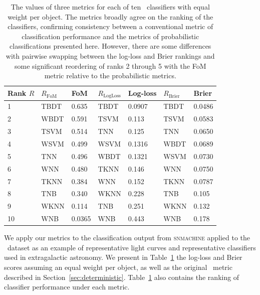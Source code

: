 \begin{table}[]
	\begin{centering}
\begin{tabular}{lllllll}%
Rank $R$ & $R_\mathrm{FoM}$ & FoM & %
$R_\mathrm{LogLoss}$ & Log-loss & $R_\mathrm{Brier}$ & Brier \\
\hline
1  & TBDT & 0.635  %
& TBDT & 0.0907 & TBDT & 0.0486 \\
2  & WBDT & 0.591  %
& TSVM & 0.113  & TSVM & 0.0583 \\
3  & TSVM & 0.514  %
& TNN  & 0.125  & TNN  & 0.0650 \\
4  & WSVM & 0.499  %
& WSVM & 0.1316 & WBDT & 0.0689 \\
5  & TNN  & 0.496  %
& WBDT & 0.1321 & WSVM & 0.0730 \\
6  & WNN  & 0.480  %
& TKNN & 0.146  & WNN  & 0.0750 \\
7  & TKNN & 0.384  %
& WNN  & 0.152  & TKNN & 0.0787 \\
8  & TNB  & 0.340  %
& WKNN & 0.228  & TNB  & 0.105  \\
9  & WKNN & 0.114  %
& TNB  & 0.251  & WKNN & 0.132  \\
10 & WNB  & 0.0365 %
& WNB  & 0.443  & WNB  & 0.178  \\
\end{tabular}
	\caption{
	The values of three metrics for each of ten \snmachine\ classifiers with equal weight per object.
	The metrics broadly agree on the ranking of the classifiers, confirming consistency between a conventional metric of classification performance and the metrics of probabilistic classifications presented here.
	However, there are some differences with pairwise swapping between the log-loss and Brier rankings and some significant reordering of ranks 2 through 5 with the FoM metric relative to the probabilistic metrics.
	}
	\label{tab:snmachineresults}
	\end{centering}
\end{table}

We apply our metrics to the classification output from \textsc{snmachine} applied to the \snphotcc\ dataset as an example of representative light curves and representative classifiers used in extragalactic astronomy.
We present in Table~\ref{tab:snmachineresults} the log-loss and Brier scores assuming an equal weight per object, as well as the original \snphotcc\ metric described in Section~\ref{sec:deterministic}.
Table~\ref{tab:snmachineresults} also contains the ranking of classifier performance under each metric.

